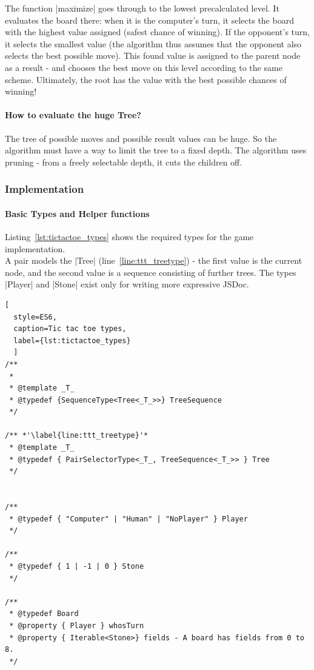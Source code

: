 The function |maximize| goes through to the lowest precalculated level. It
evaluates the board there: when it is the computer's turn, it selects the board with
the highest value assigned (safest chance of winning). If the opponent's turn,
it selects the smallest value (the algorithm thus assumes that the opponent
also selects the best possible move). This found value is assigned to the
parent node as a result - and chooses the best move on this level according to
the same scheme. Ultimately, the root has the value with the best possible
chances of winning!

\paragraph{How to evaluate the huge Tree?} The tree of possible moves and possible
result values can be huge. So the algorithm must have a way to limit the tree
to a fixed depth. The algorithm uses pruning - from a freely selectable depth,
it cuts the children off. 

\subsubsection{Implementation}
\label{subsub:alphabeta_implementation}
\paragraph{Basic Types and Helper functions} 
Listing~\ref{lst:tictactoe_types} shows the required types for the game
implementation. \\
A pair models the |Tree| (line~\ref{line:ttt_treetype}) - the first
value is the current node, and the second value is a sequence consisting of
further trees. The types |Player| and |Stone| exist only for writing more
expressive JSDoc.

\begin{lstlisting}[
  style=ES6, 
  caption=Tic tac toe types,
  label={lst:tictactoe_types}
  ]
/**
 * 
 * @template _T_
 * @typedef {SequenceType<Tree<_T_>>} TreeSequence
 */

/** *'\label{line:ttt_treetype}'*
 * @template _T_
 * @typedef { PairSelectorType<_T_, TreeSequence<_T_>> } Tree
 */


/**
 * @typedef { "Computer" | "Human" | "NoPlayer" } Player
 */

/**
 * @typedef { 1 | -1 | 0 } Stone
 */

/**
 * @typedef Board
 * @property { Player } whosTurn
 * @property { Iterable<Stone>} fields - A board has fields from 0 to 8.
 */
\end{lstlisting}

